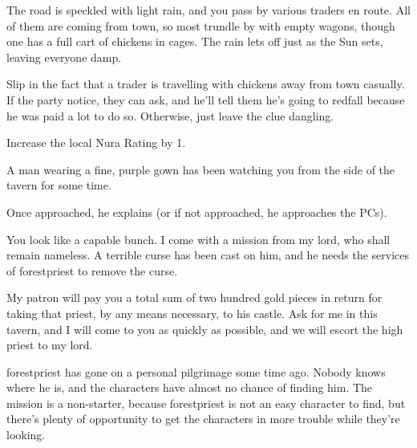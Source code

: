 \begin{multicols}{2}
\begin{boxtext}

	The road is speckled with light rain, and you pass by various traders en route.
	All of them are coming from town, so most trundle by with empty wagons, though one has a full cart of chickens in cages.
	The rain lets off just as the Sun sets, leaving everyone damp.

\end{boxtext}

Slip in the fact that a trader is travelling with chickens away from town casually.
If the party notice, they can ask, and he'll tell them he's going to \gls{redfall} because he was paid a lot to do so.
Otherwise, just leave the clue dangling.

Increase the local Nura Rating by 1.

\resumecontents[Town]

\label{nonstarter}

\stopcontents[Town]

\begin{boxtext}

	A man wearing a fine, purple gown has been watching you from the side of the tavern for some time.

\end{boxtext}

Once approached, he explains (or if not approached, he approaches the PCs).

\begin{speechtext}

	You look like a capable bunch.
	I come with a mission from my lord, who shall remain nameless.
	A terrible curse has been cast on him, and he needs the services of \gls{forestpriest} to remove the curse.

	My patron will pay you a total sum of two hundred gold pieces in return for taking that priest, by any means necessary, to his castle.
	Ask for me in this tavern, and I will come to you as quickly as possible, and we will escort the high priest to my lord.

\end{speechtext}

\Gls{forestpriest} has gone on a personal pilgrimage some time ago.
Nobody knows where he is, and the characters have almost no chance of finding him.
The mission is a non-starter, because \gls{forestpriest} is not an easy character to find, but there's plenty of opportunity to get the characters in more trouble while they're looking.


\end{multicols}
